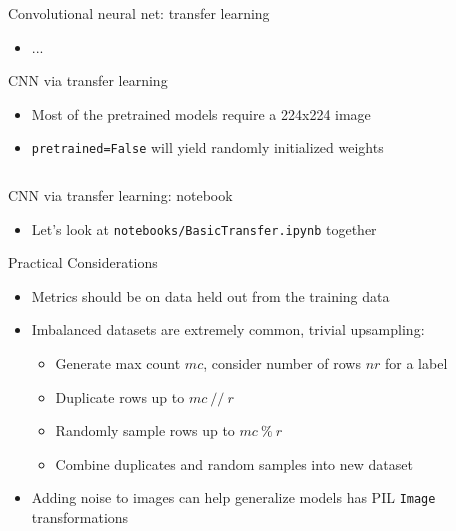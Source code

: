 \documentclass[hyperref={pdfpagelabels=false},12pt]{beamer}
\newcommand{\code}[2]{\texttt{#2}}
\newcommand{\python}[1]{\code{python}{#1}}
\newcommand{\namedUrl}[2]{\href{#1}{\color{blue}{#2}}}
\newcommand{\pygment}[3]{\inputminted[bgcolor=lightgray,linenos,fontsize=#1]{#2}{#3}}
\begin{document}
\begin{frame}{Convolutional neural net: transfer learning}
  \begin{itemize}
    \item ...
  \end{itemize}
\end{frame}

\begin{frame}{CNN via transfer learning}
  \begin{itemize}
    \item Most of the pretrained models require a 224x224 image
    \item \python{pretrained=False} will yield randomly initialized weights
  \end{itemize}
  \pygment{\scriptsize}{python}{code/transfer-model.py}
\end{frame}

\begin{frame}{CNN via transfer learning: notebook}
  \begin{itemize}
    \item Let's look at \texttt{notebooks/BasicTransfer.ipynb} together
  \end{itemize}
\end{frame}

\begin{frame}{Practical Considerations}
  \begin{itemize}
    \item Metrics should be on data held out from the training data
    \item Imbalanced datasets are extremely common, trivial upsampling:
    \begin{itemize}
      \item Generate max count $mc$, consider number of rows $nr$ for a label
      \item Duplicate rows up to $mc\ //\ r$
      \item Randomly sample rows up to $mc\ \%\ r$
      \item Combine duplicates and random samples into new dataset
    \end{itemize}
    \item Adding noise to images can help generalize models
      \namedUrl{https://pytorch.org/docs/stable/torchvision/transforms.html}{Torchvision
      transforms} has PIL \python{Image} transformations
  \end{itemize}
\end{frame}
\end{document}
